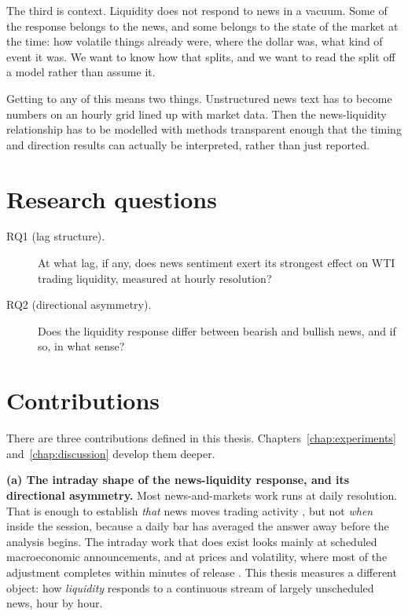 The third is context. Liquidity does not respond to news in a vacuum. Some of the response belongs to the news, and some belongs to the state of the market at the time: how volatile things already were, where the dollar was, what kind of event it was. We want to know how that splits, and we want to read the split off a model rather than assume it.

Getting to any of this means two things. Unstructured news text has to become numbers on an hourly grid lined up with market data. Then the news-liquidity relationship has to be modelled with methods transparent enough that the timing and direction results can actually be interpreted, rather than just reported.

\section{Research questions}\label{sec:research-questions}

\begin{description}
  \item[RQ1 (lag structure).] At what lag, if any, does news sentiment exert its strongest effect on WTI trading liquidity, measured at hourly resolution?
  \item[RQ2 (directional asymmetry).] Does the liquidity response differ between bearish and bullish news, and if so, in what sense?
\end{description}

\section{Contributions}\label{sec:intro-contributions}

There are three contributions defined in this thesis. Chapters~\ref{chap:experiments} and~\ref{chap:discussion} develop them deeper.

\textbf{(a) The intraday shape of the news-liquidity response, and its directional asymmetry.} Most news-and-markets work runs at daily resolution. That is enough to establish \emph{that} news moves trading activity \citep{tetlock2007}, but not \emph{when} inside the session, because a daily bar has averaged the answer away before the analysis begins. The intraday work that does exist looks mainly at scheduled macroeconomic announcements, and at prices and volatility, where most of the adjustment completes within minutes of release \citep{ederington1993}. This thesis measures a different object: how \emph{liquidity} responds to a continuous stream of largely unscheduled news, hour by hour.

